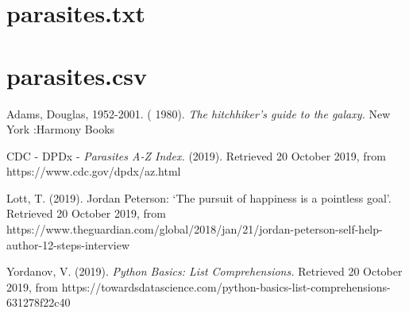 \documentclass[journal,onecolumn]{IEEEtran}
\begin{document}
\newpage

\section{parasites.txt}
\label{app1}
\lstset{basicstyle=\small}


\newpage

\section{parasites.csv}
\label{app1}
\lstset{basicstyle=\ttfamily \small}


\newpage

\begin{thebibliography}{1}



Adams, Douglas, 1952-2001. ( 1980). \emph{The hitchhiker's guide to the galaxy.} New York :Harmony Books

CDC - DPDx - \emph{Parasites A-Z Index.} (2019). Retrieved 20 October 2019, from https://www.cdc.gov/dpdx/az.html

Lott, T. (2019). Jordan Peterson: ‘The pursuit of happiness is a pointless goal’. Retrieved 20 October 2019, from https://www.theguardian.com/global/2018/jan/21/jordan-peterson-self-help-author-12-steps-interview

Yordanov, V. (2019). \emph{Python Basics: List Comprehensions.} Retrieved 20 October 2019, from https://towardsdatascience.com/python-basics-list-comprehensions-631278f22c40

\end{thebibliography}

\end{document}
